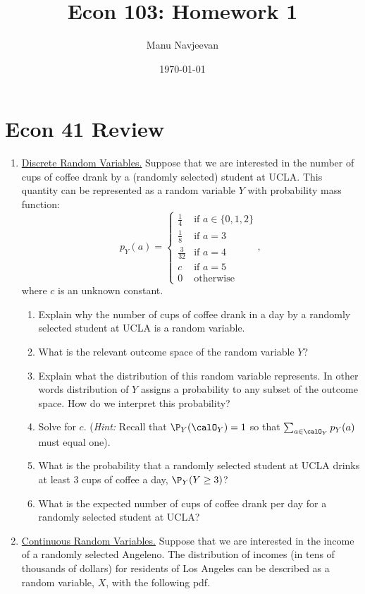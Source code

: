\documentclass[10pt]{article}
\title{Econ 103: Homework 1} %
\author{Manu Navjeevan}
\date{\today}
\begin{document}
\maketitle

\section*{Econ 41 Review}%
\label{sec:econ41review}

\begin{enumerate}
	\item \underline{Discrete Random Variables.} Suppose that we are interested in the number of cups of coffee drank by a (randomly selected) student at UCLA. This quantity can be represented as a random variable \(Y\) with probability mass function:
	 \[
		 p_Y(a) = \begin{cases}
		 	\frac{1}{4}  & \text{if } a\in \{0,1,2\} \\
			\frac{1}{8}  & \text{if } a = 3 \\
			\frac{3}{32}  &\text{if } a = 4 \\
			c &\text{if } a = 5 \\
			0 &\text{otherwise}
		 \end{cases}
	,\]
	where \(c\) is an unknown constant.
	\begin{enumerate}
		\item Explain why the number of cups of coffee drank in a day by a randomly selected student at UCLA is a random variable. 
		\item What is the relevant outcome space of the random variable \(Y\)? 
		\item Explain what the distribution of this random variable represents. In other words distribution of \(Y\) assigns a probability to any subset of the outcome space. How do we interpret this probability?
		\item Solve for \(c\). (\emph{Hint:} Recall that \(\P_Y(\calO_Y) = 1\) so that  \(\sum_{a\in\calO_Y} p_Y(a)\) must equal one).
		\item What is the probability that a randomly selected student at UCLA drinks at least 3 cups of coffee a day, \(\P_Y(Y\geq 3)\)?
		\item What is the expected number of cups of coffee drank per day for a randomly selected student at UCLA?
	\end{enumerate}
	\item \underline{Continuous Random Variables.} Suppose that we are interested in the income of a randomly selected Angeleno. The distribution of incomes (in tens of thousands of dollars) for residents of Los Angeles can be described as a random variable, \(X\), with the following pdf.

\end{enumerate}
\end{document}
